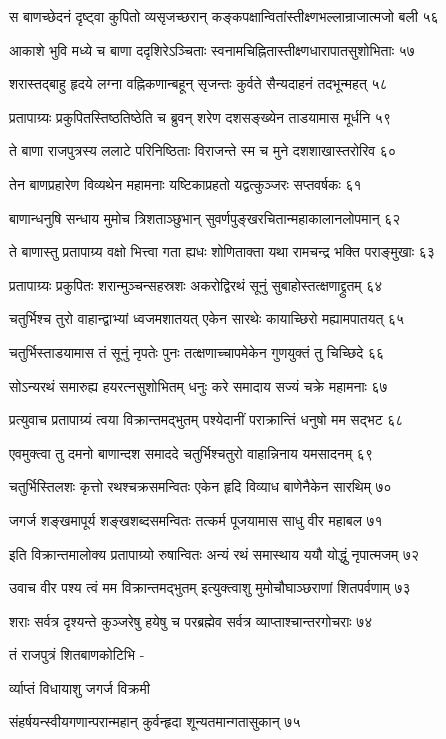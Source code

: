 स बाणच्छेदनं दृष्ट्वा कुपितो व्यसृजच्छरान्
कङ्कपक्षान्वितांस्तीक्ष्णभल्लान्राजात्मजो बली ५६

आकाशे भुवि मध्ये च बाणा ददृशिरेऽञ्चिताः
स्वनामचिह्नितास्तीक्ष्णधारापातसुशोभिताः ५७

शरास्तद्बाहु हृदये लग्ना वह्निकणान्बहून्
सृजन्तः कुर्वते सैन्यदाहनं तदभून्महत् ५८

प्रतापाग्र्यः प्रकुपितस्तिष्ठतिष्ठेति च ब्रुवन्
शरेण दशसङ्ख्येन ताडयामास मूर्धनि ५९

ते बाणा राजपुत्रस्य ललाटे परिनिष्ठिताः
विराजन्ते स्म च मुने दशशाखास्तरोरिव ६०

तेन बाणप्रहारेण विव्यथेन महामनाः
यष्टिकाप्रहतो यद्वत्कुञ्जरः सप्तवर्षकः ६१

बाणान्धनुषि सन्धाय मुमोच त्रिशताञ्छुभान्
सुवर्णपुङ्खरचितान्महाकालानलोपमान् ६२

ते बाणास्तु प्रतापाग्र्य वक्षो भित्त्वा गता ह्यधः
शोणिताक्ता यथा रामचन्द्र भक्ति पराङ्मुखाः ६३

प्रतापाग्र्यः प्रकुपितः शरान्मुञ्चन्सहस्रशः
अकरोद्विरथं सूनुं सुबाहोस्तत्क्षणाद्द्रुतम् ६४

चतुर्भिश्च तुरो वाहान्द्वाभ्यां ध्वजमशातयत्
एकेन सारथेः कायाच्छिरो मह्यामपातयत् ६५

चतुर्भिस्ताडयामास तं सूनुं नृपतेः पुनः
तत्क्षणाच्चापमेकेन गुणयुक्तं तु चिच्छिदे ६६

सोऽन्यरथं समारुह्य हयरत्नसुशोभितम्
धनुः करे समादाय सज्यं चक्रे महामनाः ६७

प्रत्युवाच प्रतापाग्र्यं त्वया विक्रान्तमद्भुतम्
पश्येदानीं पराक्रान्तिं धनुषो मम सद्भट ६८

एवमुक्त्वा तु दमनो बाणान्दश समाददे
चतुर्भिश्चतुरो वाहान्निनाय यमसादनम् ६९

चतुर्भिस्तिलशः कृत्तो रथश्चक्रसमन्वितः
एकेन हृदि विव्याध बाणेनैकेन सारथिम् ७०

जगर्ज शङ्खमापूर्य शङ्खशब्दसमन्वितः
तत्कर्म पूजयामास साधु वीर महाबल ७१

इति विक्रान्तमालोक्य प्रतापाग्र्यो रुषान्वितः
अन्यं रथं समास्थाय ययौ योद्धुं नृपात्मजम् ७२

उवाच वीर पश्य त्वं मम विक्रान्तमद्भुतम्
इत्युक्त्वाशु मुमोचौघाञ्छराणां शितपर्वणाम् ७३

शराः सर्वत्र दृश्यन्ते कुञ्जरेषु हयेषु च
परब्रह्मेव सर्वत्र व्याप्ताश्चान्तरगोचराः ७४

तं राजपुत्रं शितबाणकोटिभि -

र्व्याप्तं विधायाशु जगर्ज विक्रमी

संहर्षयन्स्वीयगणान्परान्महान्
कुर्वन्हृदा शून्यतमान्गतासुकान् ७५

